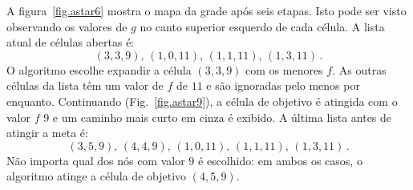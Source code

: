 {%

A figura~\ref{fig.astar6} mostra o mapa da grade após seis etapas. Isto pode ser visto observando os valores de $g$ no canto superior esquerdo de cada célula. A lista atual de células abertas é:
\[
(3,3,9),\, (1,0,11),\, (1,1,11),\, (1,3,11)\,.
\]
O algoritmo \astar{} escolhe expandir a célula $(3,3,9)$ com os menores $f$. As outras células da lista têm um valor de $f$ de $11$ e são ignoradas pelo menos por enquanto. Continuando (Fig.~\ref{fig.astar9}), a célula de objetivo é atingida com o valor $f$ $9$ e um caminho mais curto em cinza é exibido. A última lista antes de atingir a meta é:
\[
(3,5,9),\, (4,4,9),\, (1,0,11),\, (1,1,11),\, (1,3,11)\,.
\]
Não importa qual dos nós com valor $9$ é escolhido: em ambos os casos, o algoritmo atinge a célula de objetivo $(4,5,9)$.

}
